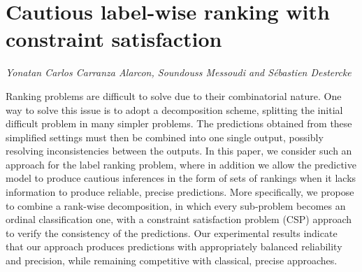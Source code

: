 \documentclass[../booklet.tex]{subfiles}
\begin{document}
\section[Cautious label-wise ranking with constraint satisfaction. {\it Yonatan Carlos Carranza Alarcon, Soundouss Messoudi and Sébastien Destercke}]{Cautious label-wise ranking with constraint satisfaction}
  

\begin{center}
  {\it Yonatan Carlos Carranza Alarcon, Soundouss Messoudi and Sébastien Destercke}
\end{center}

\vskip 0.8cm


Ranking problems are difficult to solve due to their combinatorial nature. One way to solve this issue is to adopt a decomposition scheme, splitting the initial difficult problem in many simpler problems. The predictions obtained from these simplified settings must then be combined into one single output, possibly resolving inconsistencies between the outputs. In this paper, we consider such an approach for the label ranking problem, where in addition we allow the predictive model to produce cautious inferences in the form of sets of rankings when it lacks information to produce reliable, precise predictions. More specifically, we propose to combine a rank-wise decomposition, in which every sub-problem becomes an ordinal classification one, with a constraint satisfaction problem (CSP) approach to verify the consistency of the predictions. Our experimental results indicate that our approach produces predictions with appropriately balanced reliability and precision, while remaining competitive with classical, precise approaches.
\end{document}
